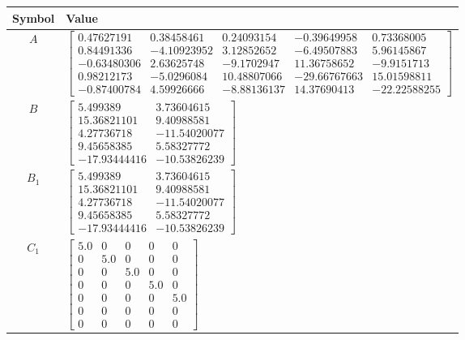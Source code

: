 \begin{tabular}{cl}
\hline
  Symbol  & Value                                                                                                                                                                                                                                                                                                                                                                                 \\
\hline
   $A$    & $\left[\begin{matrix}0.47627191 & 0.38458461 & 0.24093154 & -0.39649958 & 0.73368005\\0.84491336 & -4.10923952 & 3.12852652 & -6.49507883 & 5.96145867\\-0.63480306 & 2.63625748 & -9.1702947 & 11.36758652 & -9.9151713\\0.98212173 & -5.0296084 & 10.48807066 & -29.66767663 & 15.01598811\\-0.87400784 & 4.59926666 & -8.88136137 & 14.37690413 & -22.22588255\end{matrix}\right]$ \\
   $B$    & $\left[\begin{matrix}5.499389 & 3.73604615\\15.36821101 & 9.40988581\\4.27736718 & -11.54020077\\9.45658385 & 5.58327772\\-17.93444416 & -10.53826239\end{matrix}\right]$                                                                                                                                                                                                             \\
 $B_{1}$  & $\left[\begin{matrix}5.499389 & 3.73604615\\15.36821101 & 9.40988581\\4.27736718 & -11.54020077\\9.45658385 & 5.58327772\\-17.93444416 & -10.53826239\end{matrix}\right]$                                                                                                                                                                                                             \\
 $C_{1}$  & $\left[\begin{matrix}5.0 & 0 & 0 & 0 & 0\\0 & 5.0 & 0 & 0 & 0\\0 & 0 & 5.0 & 0 & 0\\0 & 0 & 0 & 5.0 & 0\\0 & 0 & 0 & 0 & 5.0\\0 & 0 & 0 & 0 & 0\\0 & 0 & 0 & 0 & 0\end{matrix}\right]$                                                                                                                                                                                                \\

\end{tabular}
